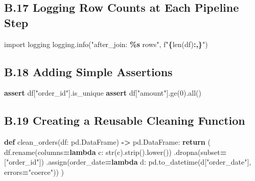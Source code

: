 \documentclass[
  12pt,
]{article}
\newenvironment{Shaded}{\begin{snugshade}}{\end{snugshade}}
\newcommand{\BuiltInTok}[1]{#1}
\newcommand{\ControlFlowTok}[1]{\textcolor[rgb]{0.13,0.29,0.53}{\textbf{#1}}}
\newcommand{\DecValTok}[1]{\textcolor[rgb]{0.00,0.00,0.81}{#1}}
\newcommand{\ImportTok}[1]{#1}
\newcommand{\KeywordTok}[1]{\textcolor[rgb]{0.13,0.29,0.53}{\textbf{#1}}}
\newcommand{\NormalTok}[1]{#1}
\newcommand{\OperatorTok}[1]{\textcolor[rgb]{0.81,0.36,0.00}{\textbf{#1}}}
\newcommand{\SpecialCharTok}[1]{\textcolor[rgb]{0.81,0.36,0.00}{\textbf{#1}}}
\newcommand{\SpecialStringTok}[1]{\textcolor[rgb]{0.31,0.60,0.02}{#1}}
\newcommand{\StringTok}[1]{\textcolor[rgb]{0.31,0.60,0.02}{#1}}
\begin{document}
\subsection{B.17 Logging Row Counts at Each Pipeline
Step}\label{b.17-logging-row-counts-at-each-pipeline-step}

\begin{Shaded}
\begin{Highlighting}[]
\ImportTok{import}\NormalTok{ logging}
\NormalTok{logging.info(}\StringTok{"after\_join: }\SpecialCharTok{\%s}\StringTok{ rows"}\NormalTok{, }\SpecialStringTok{f"}\SpecialCharTok{\{}\BuiltInTok{len}\NormalTok{(df)}\SpecialCharTok{:,\}}\SpecialStringTok{"}\NormalTok{)}
\end{Highlighting}
\end{Shaded}

\subsection{B.18 Adding Simple
Assertions}\label{b.18-adding-simple-assertions}

\begin{Shaded}
\begin{Highlighting}[]
\ControlFlowTok{assert}\NormalTok{ df[}\StringTok{"order\_id"}\NormalTok{].is\_unique}
\ControlFlowTok{assert}\NormalTok{ df[}\StringTok{"amount"}\NormalTok{].ge(}\DecValTok{0}\NormalTok{).}\BuiltInTok{all}\NormalTok{()}
\end{Highlighting}
\end{Shaded}

\subsection{B.19 Creating a Reusable Cleaning
Function}\label{b.19-creating-a-reusable-cleaning-function}

\begin{Shaded}
\begin{Highlighting}[]
\KeywordTok{def}\NormalTok{ clean\_orders(df: pd.DataFrame) }\OperatorTok{{-}\textgreater{}}\NormalTok{ pd.DataFrame:}
    \ControlFlowTok{return}\NormalTok{ (}
\NormalTok{        df.rename(columns}\OperatorTok{=}\KeywordTok{lambda}\NormalTok{ c: }\BuiltInTok{str}\NormalTok{(c).strip().lower())}
\NormalTok{        .dropna(subset}\OperatorTok{=}\NormalTok{[}\StringTok{"order\_id"}\NormalTok{])}
\NormalTok{        .assign(order\_date}\OperatorTok{=}\KeywordTok{lambda}\NormalTok{ d: pd.to\_datetime(d[}\StringTok{"order\_date"}\NormalTok{], errors}\OperatorTok{=}\StringTok{"coerce"}\NormalTok{))}
\NormalTok{    )}
\end{Highlighting}
\end{Shaded}
\end{document}
